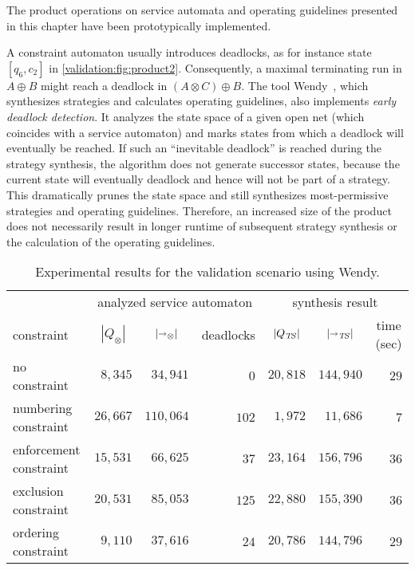 The product operations on service automata and operating guidelines presented in this chapter have been prototypically implemented.

A constraint automaton usually introduces deadlocks, as for instance state $[q_{6},c_{2}]$ in \autoref{validation:fig:product2}. Consequently, a maximal terminating run in $A\oplus B$ might reach a deadlock in $(A\otimes C)\oplus B$. The tool Wendy~\cite{LohmannW_2009_wendy}, which synthesizes strategies and calculates operating guidelines, also implements \emph{early deadlock detection}. It analyzes the state space of a given open net (which coincides with a service automaton) and marks states from which a deadlock will eventually be reached. If such an ``inevitable deadlock'' is reached during the strategy synthesis, the algorithm does not generate successor states, because the current state will eventually deadlock and hence will not be part of a strategy. This dramatically prunes the state space and still synthesizes most-permissive strategies and operating guidelines. Therefore, an increased size of the product does not necessarily result in longer runtime of subsequent strategy synthesis or the calculation of the operating guidelines.



\begin{table}
\centering
\caption{Experimental results for the validation scenario using Wendy.}
\medskip
\label{tab:synthesisvalidation}
\footnotesize
\begin{tabular*}{\textwidth}{@{\extracolsep{\fill}}lrrrrrr}
\toprule
& \multicolumn{3}{c}{analyzed service automaton} & \multicolumn{3}{c}{synthesis result} \\ 
constraint & \multicolumn{1}{c}{$|Q_{\otimes}|$} & \multicolumn{1}{c}{$|{\shortrightarrow}_{\otimes}|$} & \multicolumn{1}{c}{\hspace{-1em}deadlocks} & \multicolumn{1}{c}{$|Q_{\mathit{T\!S}}|$} & \multicolumn{1}{c}{$|{\shortrightarrow}_{\mathit{T\!S}}|$} & \multicolumn{1}{c}{\hspace{-1em}time (sec)} \\ \midrule
no constraint &     $8{,}345$ & $34{,}941$ & $0$ & $20{,}818$ & $144{,}940$ &  $29$ \\ %
numbering constraint &     $26{,}667$ & $110{,}064$ & $102$ & $1{,}972$ & $11{,}686$ &  $7$ \\ %
enforcement constraint &     $15{,}531$ & $66{,}625$ & $37$ & $23{,}164$ & $156{,}796$ &  $36$ \\ %
exclusion constraint &     $20{,}531$ & $85{,}053$ & $125$ & $22{,}880$ & $155{,}390$ &  $36$ \\ %
ordering constraint &     $9{,}110$ & $37{,}616$ & $24$ & $20{,}786$ & $144{,}796$ &  $29$ \\ %
\bottomrule
\end{tabular*}
\end{table}

